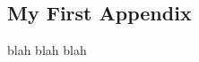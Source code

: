 \begin{appendices}

\chapter{My First Appendix}
\label{appendix:app-1}

blah blah blah
\end{appendices}
